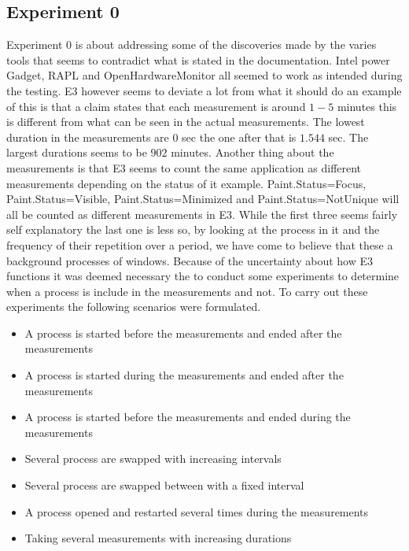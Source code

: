 \subsection{Experiment 0}
Experiment 0 is about addressing some of the discoveries made by the varies tools that seems to contradict what is stated in the documentation.
Intel power Gadget, RAPL and OpenHardwareMonitor all seemed to work as intended during the testing. E3 however seems to deviate a lot from what it should do an example of this is that a claim states that each measurement is around $1-5$ minutes this is different from what can be seen in the actual measurements. The lowest duration in the measurements are $0$ sec the one after that is $1.544$ sec. The largest durations seems to be $902$ minutes. Another thing about the measurements is that E3 seems to count the same application as different measurements depending on the status of it example. Paint.Status=Focus, Paint.Status=Visible, Paint.Status=Minimized and Paint.Status=NotUnique will all be counted as different measurements in E3. While the first three seems fairly self explanatory the last one is less so, by looking at the process in it and the frequency of their repetition over a period, we have come to believe that these a background processes of windows. 
Because of the uncertainty about how E3 functions it was deemed necessary the to conduct some experiments to determine when a process is include in the measurements and not. To carry out these experiments the following scenarios were formulated.
\begin{itemize}
    \item A process is started before the measurements and ended after the measurements
    \item A process is started during the measurements and ended after the measurements
    \item A process is started before the measurements and ended during the measurements
    \item Several process are swapped with increasing intervals
    \item Several process are swapped between with a fixed interval
    \item A process opened and restarted several times during the measurements
    \item Taking several measurements with increasing durations
\end{itemize}